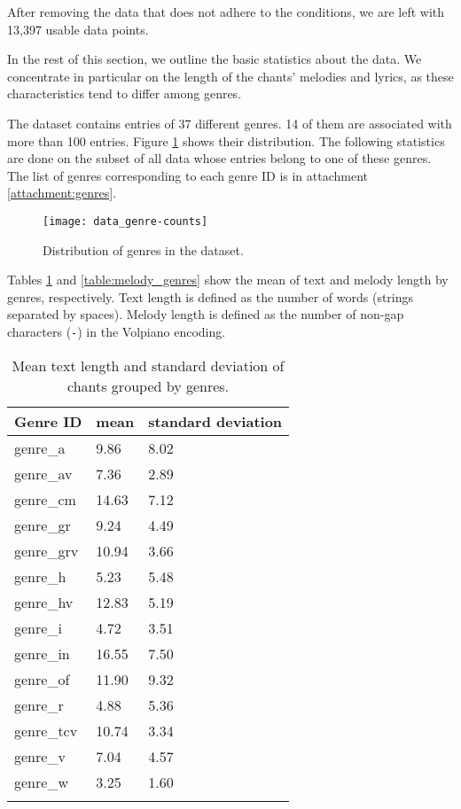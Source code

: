 After removing the data that does not adhere to the conditions, we are left with 13,397 usable data points.

In the rest of this section, we outline the basic statistics about the data. We concentrate in particular on the length of the chants'
melodies and lyrics, as these characteristics tend to differ among genres.

The dataset contains entries of 37 different genres. 14 of them are associated with more than 100 entries. Figure \ref{fig:genre-counts}
shows their distribution. The following statistics are done on the subset of all data whose entries belong to one of these genres.
The list of genres corresponding to each genre ID is in attachment \ref{attachment:genres}.

\begin{figure}[h!]
\centering
\texttt{[image: data\_genre-counts]}
\caption{Distribution of genres in the dataset.}
\label{fig:genre-counts}
\end{figure}

Tables \ref{table:text_genres} and \ref{table:melody_genres} show the mean of text and melody length by genres, respectively. Text length is defined as the number of words
(strings separated by spaces). Melody length is defined as the number of non-gap characters (\verb|-|) in the Volpiano encoding.

\begin{longtable}{| p{} | p{} | p{} |}

\hline
Genre ID & mean & standard deviation \\
\hline
genre\_a & 9.86 & 8.02 \\
genre\_av & 7.36 & 2.89 \\
genre\_cm & 14.63 & 7.12 \\
genre\_gr & 9.24 & 4.49 \\
genre\_grv & 10.94 & 3.66 \\
genre\_h & 5.23 & 5.48 \\
genre\_hv & 12.83 & 5.19 \\
genre\_i & 4.72 & 3.51 \\
genre\_in & 16.55 & 7.50 \\
genre\_of & 11.90 & 9.32 \\
genre\_r & 4.88 & 5.36 \\
genre\_tcv & 10.74 & 3.34 \\
genre\_v & 7.04 & 4.57 \\
genre\_w & 3.25 & 1.60 \\
\hline

\caption{Mean text length and standard deviation of chants grouped by genres.}
\label{table:text_genres}
\end{longtable}

